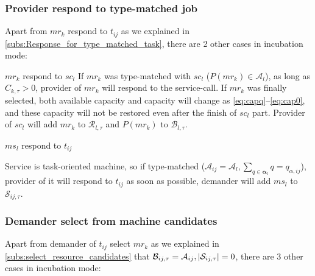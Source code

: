 \subsubsection{Provider respond to type-matched job} %
\label{ssub:response_in_type_matched_resource}
Apart from $mr_k$ respond to $t_{ij}$ as we explained in \autoref{subs:Response_for_type_matched_task}, there are 2 other cases in incubation mode:
\begin{asparaenum}
\item $mr_k$ respond to $sc_l$
If $mr_k$ was type-matched with $sc_l$ ($P(mr_k)\in\mathcal{A}_l$), as long as $C_{k,\tau}> 0$, provider of $mr_k$ will respond to the service-call. If $mr_k$ was finally selected, both available capacity and capacity will change as \autoref{eq:capq}--\ref{eq:cap0}, and these capacity will not be restored even after the finish of $sc_l$ part. Provider of $sc_l$ will add $mr_k$ to $\mathcal{R}_{l,\tau}$ and $P(mr_k)$ to $\mathcal{B}_{l,\tau}$.
\item $ms_l$ respond to $t_{ij}$
\end{asparaenum}
Service is task-oriented machine, so if type-matched ($\mathcal{A}_{ij} =\mathcal{A}_l,\sum_{q\in\bm{\alpha}_l} q = q_{\alpha,ij}$), provider of it will respond to $t_{ij}$ as soon as possible, demander will add $ms_l$ to $\mathcal{S}_{ij,\tau}$.


\subsubsection{Demander select from machine candidates} %
\label{ssub:selection_in_resource_candidates_for_service_call}
Apart from demander of $t_{ij}$ select $mr_k$ as we explained in \autoref{subs:select_resource_candidates} that $\mathcal{B}_{ij,\tau} = \mathcal{A}_{ij},\left|\mathcal{S}_{ij,\tau}\right|=0$, there are 3 other cases in incubation mode:

